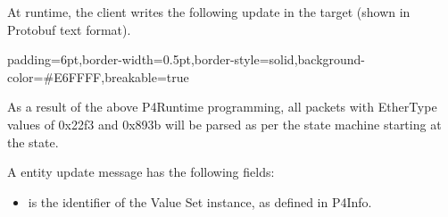 \documentclass[11pt]{article}
\begin{document}
{%
\noindent{}At runtime, the client writes the following update in the target (shown in
Protobuf text format).%

\begin{mdbmargintb}{6pt}{6pt}%
\begin{mdblock}{padding=6pt,border-width=0.5pt,border-style=solid,background-color=\#E6FFFF,breakable=true}%
\begin{mdpre}%
\end{mdpre}%
\end{mdblock}%
\end{mdbmargintb}%

\noindent{}As a result of the above P4Runtime programming, all packets with EtherType
values of 0x22f3 and 0x893b will be parsed as per the state machine starting at
the  state.%

A  entity update message has the following fields:%

\begin{itemize}%

\item{}
 is the  identifier of the Value Set instance, as
defined in P4Info.%


\end{itemize}}
\end{document}
